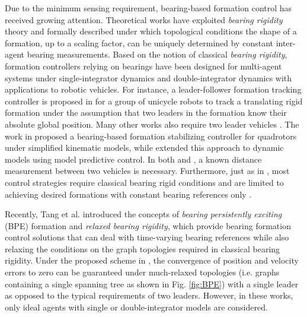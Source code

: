 Due to the minimum sensing requirement,  bearing-based formation control has received growing attention.
Theoretical works \cite{zhao2016bearing,eren2003sensor} have exploited \textit{bearing rigidity} theory and formally described under which topological conditions the shape of a formation, up to a scaling factor, can be uniquely determined by constant inter-agent bearing measurements.
Based on the notion of classical \textit{bearing rigidity}, formation controllers relying on bearings have been designed for multi-agent systems under single-integrator dynamics \cite{zhao2016bearing, trinh2018bearing} and double-integrator dynamics \cite{zhao2019bearing} with applications to robotic vehicles.
For instance, a leader-follower formation tracking controller is proposed in \cite{zhao2019bearing} for a group of unicycle robots to track a translating rigid formation under the assumption that two leaders in the formation know their absolute global position. Many other works also require two leader vehicles \cite{parada2024twoleaders, ding_dynamics_2024, chen2023twoleaders, xu2020affine}.
The work in \cite{schiano2016rigidity} proposed a bearing-based formation stabilizing controller for quadrotors under simplified kinematic models, while \cite{erskine2021model} extended this approach to dynamic models using model predictive control. In both \cite{schiano2016rigidity} and \cite{erskine2021model}, a known distance measurement between two vehicles is necessary. Furthermore, just as in \cite{schiano2016rigidity}, most control strategies require classical bearing rigid conditions and are limited to achieving desired formations with constant bearing references only \cite{zhao2016bearing, trinh2019bearing}.


Recently, Tang et al. \cite{tang2022relaxed, tang2021formation} introduced the concepts of \textit{bearing persistently exciting} (BPE) formation and \textit{relaxed bearing rigidity}, which provide bearing formation control solutions that can deal with time-varying bearing references while also relaxing the conditions on the graph topologies required in classical bearing rigidity. Under the proposed scheme in \cite{tang2021formation}, the convergence of position and velocity errors to zero can be guaranteed under much-relaxed topologies (i.e. graphs containing a single spanning tree as shown in Fig. \ref{fig:BPE}) with a single leader as opposed to the typical requirements of two leaders. However, in these works, only ideal agents with single or double-integrator models are considered. 

